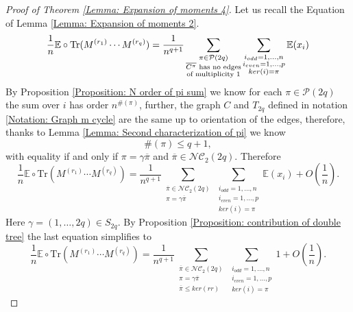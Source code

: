 \documentclass{article}
\newtheorem{lemma}      [theorem]{Lemma}
\theoremstyle{definition}
\newcommand{\E}{\mathbb{E}}
\newcommand{\cP}{\mathcal{P}}
\newcommand{\NC}{\mathcal{NC}}
\newcommand{\Tr}{\text{Tr}}
\begin{document}
{%
\begin{proof}[Proof of Theorem \ref{Lemma: Expansion of moments 4}]
Let us recall the Equation of Lemma \ref{Lemma: Expansion of moments 2}.
$$\frac{1}{n}\E\circ \textup{\Tr}(M^{(r_1)}\cdots M^{(r_q)})=\frac{1}{n^{q+1}}\sum_{\substack{\pi\in \cP(2q)\\ \overline{C^\pi} \text{ has no edges} \\\text{of multiplicity }1}}\sum_{\substack{i_{odd}=1,\dots,n \\ i_{even}=1,\dots,p \\ ker(i)=\pi}}\E(x_i)$$
By Proposition \ref{Proposition: N order of pi sum} we know for each $\pi\in \cP(2q)$ the sum over $i$ has order $n^{\#(\pi)}$, further, the graph $C$ and $T_{2q}$ defined in notation \ref{Notation: Graph m cycle} are the same up to orientation of the edges, therefore, thanks to Lemma \ref{Lemma: Second characterization of pi} we know
$$\#(\pi)\leq q+1,$$
with equality if and only if $\pi=\gamma\overline{\pi}$ and $\overline{\pi}\in \NC_2(2q)$. Therefore
\begin{equation*}
\frac{1}{n}\E\circ \Tr(M^{(r_1)}\cdots M^{(r_q)})=\frac{1}{n^{q+1}}\sum_{\substack{\overline{\pi}\in \NC_2(2q) \\ \pi=\gamma\overline{\pi}}}\sum_{\substack{i_{odd}=1,\dots,n \\ i_{even}=1,\dots,p \\ ker(i)=\pi}}\E(x_i)+O(\frac{1}{n}).
\end{equation*}
Here $\gamma=(1,\dots,2q)\in S_{2q}$. By Proposition \ref{Proposition: contribution of double tree} the last equation simplifies to
\begin{equation}\label{Aux 3}
\frac{1}{n}\E\circ \Tr(M^{(r_1)}\cdots M^{(r_q)})=\frac{1}{n^{q+1}}\sum_{\substack{\overline{\pi}\in \NC_2(2q) \\ \pi=\gamma\overline{\pi} \\ \overline{\pi}\leq ker(rr)}}\sum_{\substack{i_{odd}=1,\dots,n \\ i_{even}=1,\dots,p \\ ker(i)=\pi}}1+O(\frac{1}{n}).

\end{equation}
\end{proof}}
\end{document}
